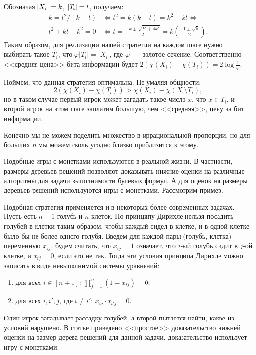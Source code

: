 Обозначая $|X_i| = k$, $|T_i| = t$, получаем:
\begin{align*}
	k = t^2 / (k - t) &\iff t^2 = k(k - t) = k^2 - kt \iff\\
	t^2 + kt - k^2 = 0 &\iff t = \frac{-k \pm \sqrt{k^2 + 4k^2}}{2} = k\left(\frac{-1 \pm \sqrt{5}}{2} \right).
\end{align*}
Таким образом, для реализации нашей стратегии на каждом шаге нужно выбирать такое $T_i$, что $\varphi
|T_i| = |X_i|$, где $\varphi$~--- золотое сечение. Соответственно <<средняя цена>> бита информации будет
$2(\chi(X_i) - \chi(T_i)) = 2 \log \frac{1}{\varphi}$.

Поймем, что данная стратегия оптимальна. Не умаляя общности:
$$
    2 (\chi(X_i) - \chi(T_i)) > \chi(X_i) - \chi(X_i \setminus T_i),
$$
но в таком случае первый игрок может загадать такое число $x$, что $x \in T_i$, и второй игрок на этом
шаге заплатим большую, чем <<средняя>>, цену за бит информации.

\begin{remark}
    Конечно мы не можем поделить множество в иррациональной пропорции, но для больших $n$ мы можем сколь
    угодно близко приблизится к этому.
\end{remark}


Подобные игры с монетками используются в реальной жизни. В частности, размеры деревьев решений позволяют
доказывать нижние оценки на различные алгоритмы для задачи выполнимости булевых формул. А для оценок на
размеры деревьев решений используются игры с монетками. Рассмотрим пример.

\begin{example}
	Подобная стратегия применяется и в некоторых более современных задачах. Пусть есть $n + 1$ голубь и
    $n$ клеток. По принципу Дирихле нельзя посадить голубей в клетки таким образом, чтобы каждый сидел в
    клетке, и в одной клетке было бы не более одного голубя. Введем для каждой пары (голубь, клетка)
    переменную $x_{ij}$, будем считать, что  $x_{ij} = 1$ означает, что $i$-ый голубь сидит в $j$-ой
    клетке, и $x_{ij} = 0$, если это не так. Тогда эти условия принципа Дирихле можно записать в виде
    невыполнимой системы уравнений:
    \begin{enumerate}
        \item для всех $i \in [n + 1]$: $\prod\limits_{j = 1}^{n}(1 - x_{ij}) = 0$;
        \item для всех $i, i', j$, где $i \neq i'$: $x_{ij} \cdot x_{i'j} = 0$.
    \end{enumerate}

    Один игрок загадывает рассадку голубей, а второй пытается найти, какое из условий нарушено. В статье
    \cite{BeyGalLau10} приведено <<простое>> доказательство нижней оценки на размер дерева решений для
    данной задачи, доказательство использует игру с монетками.
\end{example}


